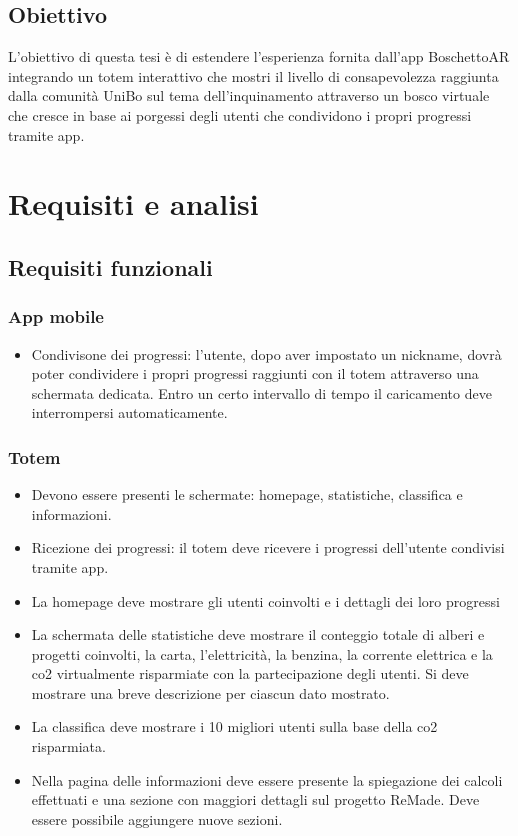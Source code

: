 \subsection{Obiettivo}
L'obiettivo di questa tesi è di estendere l'esperienza fornita dall'app BoschettoAR integrando un totem interattivo che mostri il livello di consapevolezza raggiunta dalla comunità UniBo sul tema dell'inquinamento attraverso un bosco virtuale che cresce in base ai porgessi degli utenti  che condividono i propri progressi tramite app.

\section{Requisiti e analisi}
\subsection{Requisiti funzionali}
\subsubsection{App mobile}
\begin{itemize}
    \item Condivisone dei progressi: l'utente, dopo aver impostato un nickname, dovrà poter condividere i propri progressi raggiunti con il totem attraverso una schermata dedicata. Entro un certo intervallo di tempo il caricamento deve interrompersi automaticamente.
\end{itemize}
\subsubsection{Totem}
\begin{itemize}
    \item Devono essere presenti le schermate: homepage, statistiche, classifica e informazioni.
    \item Ricezione dei progressi: il totem deve ricevere i progressi dell'utente condivisi tramite app.
    \item La homepage deve mostrare gli utenti coinvolti e i dettagli dei loro progressi 
    \item La schermata delle statistiche deve mostrare il conteggio totale di alberi e progetti coinvolti, la carta, l'elettricità, la benzina, la corrente elettrica e la co2 virtualmente risparmiate con la partecipazione degli utenti. Si deve mostrare una breve descrizione per ciascun dato mostrato.
    \item La classifica deve mostrare i 10 migliori utenti sulla base della co2 risparmiata.
    \item Nella pagina delle informazioni deve essere presente la spiegazione dei calcoli effettuati e una sezione con maggiori dettagli sul progetto ReMade. Deve essere possibile aggiungere nuove sezioni.
\end{itemize}
